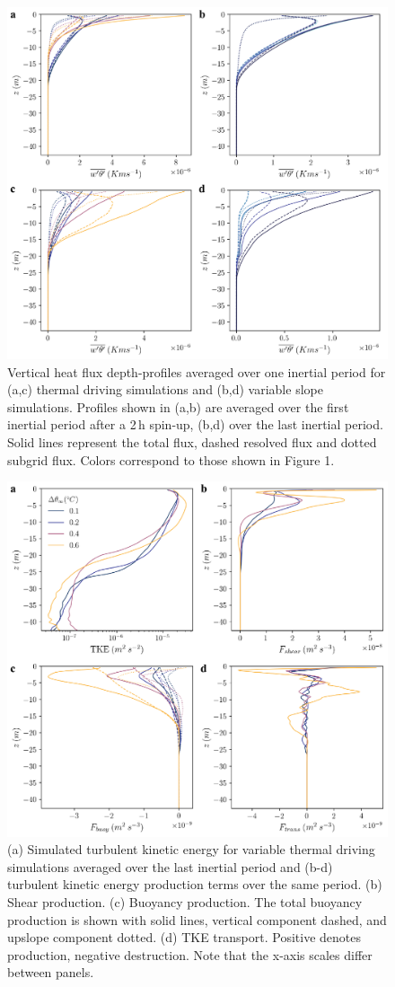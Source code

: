 \documentclass[tc, manuscript]{copernicus}
\begin{document}
\begin{figure}[t]
\includegraphics[width=12cm]{figS1.pdf}
\caption{Vertical heat flux depth-profiles averaged over one inertial period for (a,c) thermal driving simulations and (b,d) variable slope simulations. Profiles shown in (a,b) are averaged over the first inertial period after a 2\,\unit{h} spin-up, (b,d) over the last inertial period. Solid lines
represent the total flux, dashed resolved flux and dotted subgrid flux. Colors correspond to those shown in Figure 1.}
\label{fig:res_sgs_flux}
\end{figure}

\begin{figure}[t]
\includegraphics[width=12cm]{figS2.pdf}
\caption{(a) Simulated turbulent kinetic energy for variable thermal driving simulations averaged over the last inertial period and (b-d) turbulent kinetic energy production terms over the same period. (b) Shear production. (c) Buoyancy production. The total buoyancy production is shown with solid lines, vertical component dashed, and upslope component dotted. (d) TKE transport. Positive denotes production, negative destruction. Note that the x-axis scales differ between panels.}
\label{fig:tke_budget_1}
\end{figure}
\end{document}

